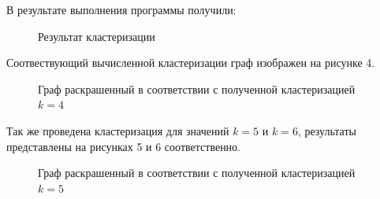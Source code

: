 \documentclass[a5paper, 10pt]{article}
\theoremstyle{definition}
\theoremstyle{plain}
\theoremstyle{remark}
\begin{document}
В результате выполнения программы получили:
\begin{figure}[h!]
\caption{Результат кластеризации}
\end{figure}

Соотвествующий вычисленной кластеризации граф изображен на рисунке 4.
\begin{figure}[h!]
\caption{Граф раскрашенный в соответствии с полученной кластеризацией $k=4$}
\end{figure}
\newpage
Так же проведена кластеризация для значений $k=5$ и $k=6$, результаты представлены на рисунках 5 и 6 соответственно.
\begin{figure}[h!]
\caption{Граф раскрашенный в соответствии с полученной кластеризацией $k=5$}
\end{figure}
\end{document}
